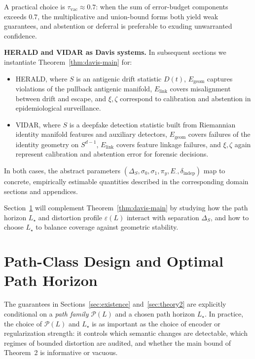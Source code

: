 \documentclass[11pt]{article}
\begin{document}
A practical choice is $\tau_{\mathrm{vac}} \approx 0.7$: when the sum of error-budget components
exceeds $0.7$, the multiplicative and union-bound forms both yield weak guarantees, and abstention
or deferral is preferable to exuding unwarranted confidence.

\medskip
\noindent\textbf{HERALD and VIDAR as Davis systems.}
In subsequent sections we instantiate Theorem~\ref{thm:davis-main} for:
\begin{itemize}[leftmargin=2em]
  \item HERALD, where $S$ is an antigenic drift statistic $D(t)$, $E_{\mathrm{geom}}$ captures
    violations of the pullback antigenic manifold, $E_{\mathrm{link}}$ covers misalignment between
    drift and escape, and $\xi,\zeta$ correspond to calibration and abstention in epidemiological
    surveillance.

  \item VIDAR, where $S$ is a deepfake detection statistic built from Riemannian identity
    manifold features and auxiliary detectors, $E_{\mathrm{geom}}$ covers failures of the identity
    geometry on $S^{d-1}$, $E_{\mathrm{link}}$ covers feature linkage failures, and $\xi,\zeta$ again
    represent calibration and abstention error for forensic decisions.
\end{itemize}

In both cases, the abstract parameters $(\Delta_S,\sigma_0,\sigma_1,\pi_y,E_{\cdot},\delta_{\mathrm{indep}})$
map to concrete, empirically estimable quantities described in the corresponding domain sections
and appendices.

\medskip
Section~\ref{sec:path-optimization} will complement Theorem~\ref{thm:davis-main} by studying
how the path horizon $L_\star$ and distortion profile $\varepsilon(L)$ interact with separation
$\Delta_S$, and how to choose $L_\star$ to balance coverage against geometric stability.

\section{Path-Class Design and Optimal Path Horizon}
\label{sec:path-optimization}

The guarantees in Sections~\ref{sec:existence} and~\ref{sec:theory2} are explicitly conditional on a
\emph{path family} $\mathcal{P}(L)$ and a chosen path horizon $L_\star$. In practice, the choice of
$\mathcal{P}(L)$ and $L_\star$ is as important as the choice of encoder or regularization strength:
it controls which semantic changes are detectable, which regimes of bounded distortion are audited,
and whether the main bound of Theorem~2 is informative or vacuous.
\end{document}
